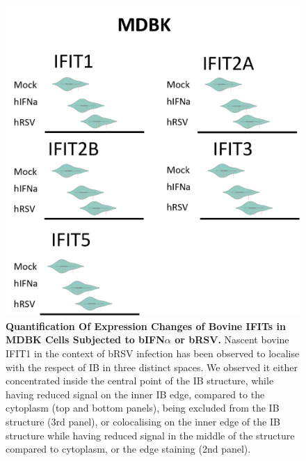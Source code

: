 \begin{figure}
    \centering
    \includegraphics[width=1\linewidth]{09. Chapter 4/Figs/01. Localisation introduction/09. mdbk plots.png}
    \caption[Quantification Of Expression Changes of Bovine IFITs in MDBK Cells Subjected to bIFN\(\alpha\) or bRSV.]{\textbf{Quantification Of Expression Changes of Bovine IFITs in MDBK Cells Subjected to bIFN\(\alpha\) or bRSV.} Nascent bovine IFIT1 in the context of bRSV infection has been observed to localise with the respect of IB in three distinct spaces. We observed it either concentrated inside the central point of the IB structure, while having reduced signal on the inner IB edge, compared to the cytoplasm (top and bottom panels), being excluded from the IB structure (3rd panel), or colocalising on the inner edge of the IB structure while having reduced signal in the middle of the structure compared to cytoplasm, or the edge staining (2nd panel).}
    \label{fig:Quantification Of Expression Changes of Bovine IFITs in MDBK Cells Subjected to bIFN\(\alpha\) or bRSV}
\end{figure}
